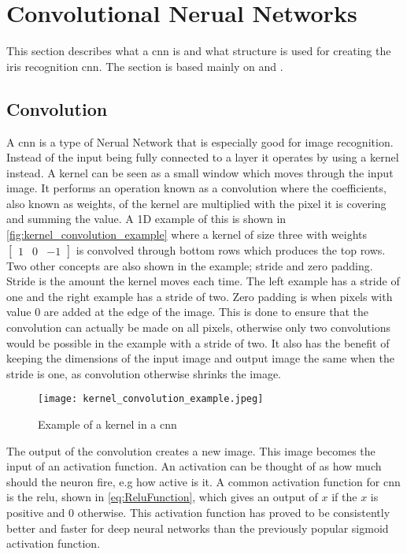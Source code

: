 \section{Convolutional Nerual Networks}\label{sec:cnn_theory}
This section describes what a \gls{cnn} is and what structure is used for creating the iris recognition \gls{cnn}. The section is based mainly on \cite{Karpathy2016a} and \cite{Nielsen2015}.

\subsection{Convolution}
A \gls{cnn} is a type of Nerual Network that is especially good for image recognition. Instead of the input being fully connected to a layer it operates by using a kernel instead. A kernel can be seen as a small window which moves through the input image. It performs an operation known as a convolution where the coefficients, also known as weights, of the kernel are multiplied with the pixel it is covering and summing the value. A 1D example of this is shown in \autoref{fig:kernel_convolution_example} where a kernel of size three with weights $\begin{bmatrix} 1 & 0 & -1 \end{bmatrix}$ is convolved through bottom rows which produces the top rows. Two other concepts are also shown in the example; stride and zero padding. Stride is the amount the kernel moves each time. The left example has a stride of one and the right example has a stride of two. Zero padding is when pixels with value $0$ are added at the edge of the image. This is done to ensure that the convolution can actually be made on all pixels, otherwise only two convolutions would be possible in the example with a stride of two. It also has the benefit of keeping the dimensions of the input image and output image the same when the stride is one, as convolution otherwise shrinks the image. 

\begin{figure}[h]
	\centering
	\texttt{[image: kernel\_convolution\_example.jpeg]}
	\caption{Example of a kernel in a \gls{cnn} \citep{Karpathy2016a}}
	\label{fig:kernel_convolution_example}
\end{figure}

The output of the convolution creates a new image. This image becomes the input of an activation function. An activation can be thought of as how much should the neuron fire, e.g how active is it. A common activation function for \gls{cnn} is the \gls{relu}, shown in \autoref{eq:ReluFunction}, which gives an output of $x$ if the $x$ is positive and 0 otherwise. This activation function has proved to be consistently better and faster for deep neural networks than the previously popular sigmoid activation function.

